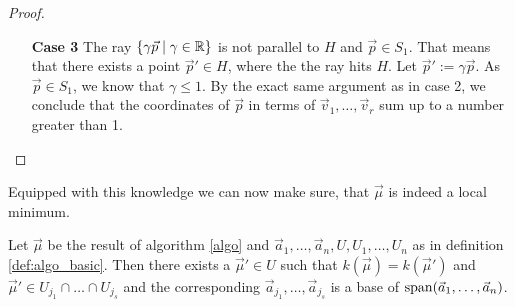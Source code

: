 \begin{proof}
\begin{itemize}
        \item[\textbf{Case 3}] The ray $\{\gamma\vec p\mid \gamma \in \mathbb{R}\}$ is not parallel to $H$ and $\vec p \in S_1$. That means that there exists a point $\vec p' \in H$, where the the ray hits $H$. Let $\vec p' := \gamma \vec p$. As $\vec p \in S_1$, we know that $\gamma \leq 1$. By the exact same argument as in case 2, we conclude that the coordinates of $\vec p$ in terms of $\vec v_1, \dots, \vec v_r$ sum up to a number greater than 1. \qedhere
    \end{itemize}
\end{proof}

Equipped with this knowledge we can now make sure, that $\vec\mu$ is indeed a local minimum.
\begin{lemma}
    \label{lemma:sub_fecets_are_extendable}
    Let $\vec\mu$ be the result of algorithm \ref{algo} and $\vec a_1, \dots, \vec a_n, U, U_1, \dots, U_n$ as in definition \ref{def:algo_basic}. Then there exists a $\vec\mu' \in U$ such that $k(\vec\mu) = k(\vec\mu')$ and $\vec\mu' \in U_{j_1} \cap \dots \cap U_{j_{s}}$ and the corresponding $\vec a_{j_1}, \dots, \vec a_{j_s}$ is a base of $\operatorname{span}(\vec a_1, \dots, \vec a_n)$.
\end{lemma}
